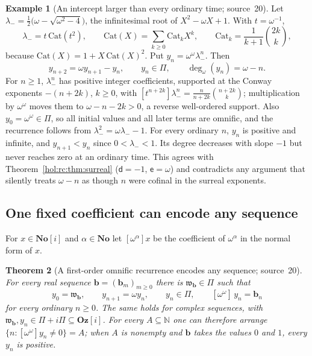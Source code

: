 \documentclass[11pt]{article}
\numberwithin{equation}{section}
\newtheorem{theorem}{Theorem}[section]
\theoremstyle{definition}
\newtheorem{example}[theorem]{Example}
\theoremstyle{remark}
\newcommand{\N}{\mathbb N}
\newcommand{\No}{\mathbf{No}}
\newcommand{\Oz}{\mathbf{Oz}}
\begin{document}
\begin{example}[An intercept larger than every ordinary time; source~20]
\label{hol:rc:ex:catalan}
Let $\lambda_-=\frac12\bigl(\omega-\sqrt{\omega^2-4}\bigr)$, the infinitesimal
root of $X^2-\omega X+1$. With $t=\omega^{-1}$,
\[
 \lambda_-=t\,\mathrm{Cat}(t^2),\qquad
 \mathrm{Cat}(X)=\sum_{k\ge0}\mathrm{Cat}_kX^k,\qquad
 \mathrm{Cat}_k=\frac1{k+1}\binom{2k}k,
\]
because $\mathrm{Cat}(X)=1+X\,\mathrm{Cat}(X)^2$. Put
$y_n=\omega^\omega\lambda_-^n$. Then
\begin{equation}\label{hol:rc:eq:catalan}
 y_{n+2}=\omega y_{n+1}-y_n,\qquad y_n\in\Pi,\qquad
 \deg_\omega(y_n)=\omega-n .
\end{equation}
For $n\ge1$, $\lambda_-^n$ has positive integer coefficients, supported at the
Conway exponents $-(n+2k)$, $k\ge0$, with $[t^{n+2k}]\lambda_-^n=
\frac n{n+2k}\binom{n+2k}k$; multiplication by $\omega^\omega$ moves them to
$\omega-n-2k>0$, a reverse well-ordered support. Also $y_0=\omega^\omega\in\Pi$,
so all initial values and all later terms are omnific, and the recurrence
follows from $\lambda_-^2=\omega\lambda_--1$. For every ordinary $n$, $y_n$ is
positive and infinite, and $y_{n+1}<y_n$ since $0<\lambda_-<1$. Its degree
decreases with slope $-1$ but never reaches zero at an ordinary time. This
agrees with Theorem~\ref{hol:rc:thm:surreal} ($\mathsf d=-1$,
$\mathsf e=\omega$) and contradicts any argument that silently treats
$\omega-n$ as though $n$ were cofinal in the surreal exponents.
\end{example}

\subsection{One fixed coefficient can encode any sequence}
\label{hol:rc:sub:coding}

For $x\in\No[i]$ and $\alpha\in\No$ let $[\omega^\alpha]x$ be the coefficient
of $\omega^\alpha$ in the normal form of $x$.

\begin{theorem}[A first-order omnific recurrence encodes any sequence;
source~20]\label{hol:rc:thm:coding}
For every real sequence $\mathbf b=(\mathbf b_m)_{m\ge0}$ there is
$\mathfrak w_{\mathbf b}\in\Pi$ such that
\[
 y_0=\mathfrak w_{\mathbf b},\qquad y_{n+1}=\omega y_n,\qquad y_n\in\Pi,
 \qquad[\omega^\omega]\,y_n=\mathbf b_n
\]
for every ordinary $n\ge0$. The same holds for complex sequences, with
$\mathfrak w_{\mathbf b},y_n\in\Pi+i\Pi\subseteq\Oz[i]$. For every
$A\subseteq\N$ one can therefore arrange
$\{n:[\omega^\omega]y_n\ne0\}=A$; when $A$ is nonempty and $\mathbf b$ takes
the values $0$ and $1$, every $y_n$ is positive.
\end{theorem}
\end{document}

